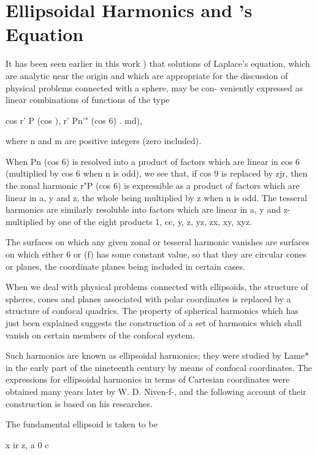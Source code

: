 \chapter{Ellipsoidal Harmonics and \Lame's Equation}


It has been seen earlier in this work ) that solutions of
Laplace's equation, which are analytic near the origin and which are
appropriate for the discussion of physical problems connected with a
sphere, may be con- veniently expressed as linear combinations of
functions of the type

cos r' P (cos ), r' Pn'" (cos 6) . md),

where n and m are positive integers (zero included).

When Pn (cos 6) is resolved into a product of factors which are linear
in cos 6 (multiplied by cos 6 when n is odd), we see that, if cos 9 is
replaced by zjr, then the zonal harmonic r"P (cos 6) is expressible as
a product of factors which are linear in a, y and z, the whole being
multiplied by z when n is odd. The tesseral harmonics are similarly
resoluble into factors which are linear in a, y and z- multiplied by
one of the eight products 1, cc, y, z, yz, zx, xy, xyz.

The surfaces on which any given zonal or tesseral harmonic vanishes
are surfaces on which either 6 or (f) has some constant value, so that
they are circular cones or planes, the coordinate planes being
included in certain cases.

When we deal with physical problems connected with ellipsoids, the
structure of spheres, cones and planes associated with polar
coordinates is replaced by a structure of confocal quadrics. The
property of spherical harmonics which has just been explained suggests
the construction of a set of harmonics which shall vanish on certain
members of the confocal system.

Such harmonics are known as ellipsoidal harmonics; they were studied
by Lame* in the early part of the nineteenth century by means of
confocal coordinates. The expressions for ellipsoidal harmonics in
terms of Cartesian coordinates were obtained many years later by W. D.
Niven-f-, and the following account of their construction is based on
his researches.

The fundamental ellipsoid is taken to be

x ir z, a 0 c

